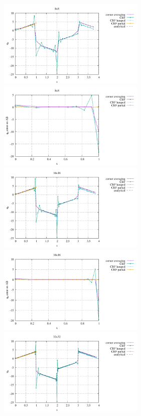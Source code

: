 \begin{center}
\includegraphics[width=7cm]{python_codes/fieldstone_173/results/exp1/heat_flux_boundary_8.pdf}
\includegraphics[width=7cm]{python_codes/fieldstone_173/results/exp1/heat_flux_boundary_bottom_8.pdf}\\
\includegraphics[width=7cm]{python_codes/fieldstone_173/results/exp1/heat_flux_boundary_16.pdf}
\includegraphics[width=7cm]{python_codes/fieldstone_173/results/exp1/heat_flux_boundary_bottom_16.pdf}\\
\includegraphics[width=7cm]{python_codes/fieldstone_173/results/exp1/heat_flux_boundary_32.pdf}

\end{center}
